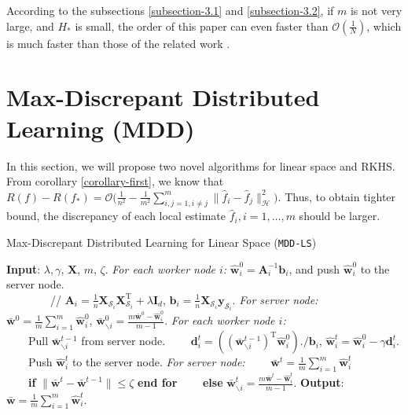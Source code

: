 \documentclass{article}
\begin{document}
According to the subsections \ref{subsection-3.1} and \ref{subsection-3.2},
if $m$ is not very large, and $H_\ast$ is small,
the order of this paper can even faster than $\mathcal{O}\left(\frac{1}{N}\right)$,
which is much faster than those of the related work \cite{zhang2012communication,Zhang2013,lin2017distributed}.

\section{Max-Discrepant Distributed Learning (MDD)}
In this section, we will propose two novel algorithms for linear space and RKHS.
From corollary \ref{corollary-first},  we know that
  $
     R(f)-R(f_\ast)=\mathcal{O}\Big(\frac{1}{n^2}-\frac{1}{m^2}\sum_{i,j=1,i\not=j}^m\|\hat{f}_i-\hat{f}_j\|_\mathcal{H}^2\Big).
$
Thus, to obtain tighter bound, the discrepancy of each local estimate $\hat{f}_i, i=1,\ldots,m$ should be larger.

\begin{algorithm}
    \caption{Max-Discrepant Distributed Learning for Linear Space (\texttt{MDD-LS})}
    \label{alg:RMMls}
    \begin{algorithmic}[1]
    \STATE \textbf{Input}: $\lambda,\gamma$, $\mathbf X$, $m$, $\zeta$.
     \STATE \emph{For each worker node $i$:} $\hat{\mathbf w}_i^0=\mathbf A_i^{-1} \mathbf b_i$, and push $\hat{\mathbf w}_i^0$ to the server node.\\
         ~~~~~~~~// $\mathbf A_i=\frac{1}{n}\mathbf X_{\mathcal{S}_i}\mathbf X_{\mathcal{S}_i}^\mathrm{T}+
            \lambda \mathbf I_d$, $\mathbf b_i= \frac{1}{n}\mathbf X_{\mathcal{S}_i}\mathbf y_{\mathcal{S}_i}$.
    \STATE \emph{For server node:}
    $\bar{\mathbf w}^0=\frac{1}{m}\sum_{i=1}^m\hat{\mathbf w}_i^0$,
    $\bar{\mathbf w}^{0}_{\backslash i}=\frac{m\bar{\mathbf w}^{0}-\hat{\mathbf w}_i^0}{m-1}$.
    \STATE  \emph{For each worker node $i$:} \\
    ~~~~Pull $\bar{\mathbf w}^{t-1}_{\backslash i}$ from server node.
    \STATE ~~~~$\mathbf d_i^t=\left(\left(\bar{\mathbf w}^{t-1}_{\backslash i}\right)^\mathrm{T}\hat{\mathbf w}_i^{0}\right)./\mathbf b_i$,
     $\hat{\mathbf w}_i^t=\hat{\mathbf w}_i^0-\gamma\mathbf d_i^t$.
    \STATE ~~~~Push $\hat{\mathbf w}_i^t$ to the server node.
     \STATE \emph{For server node:}
     \STATE ~~~~$\bar{\mathbf w}^t=\frac{1}{m}\sum_{i=1}^m\hat{\mathbf w}_i^t$\\
      ~~~~\textbf{if} {$\|\bar{\mathbf w}^{t}-\bar{\mathbf w}^{t-1}\|\leq \zeta$} \textbf{end for}
      \STATE ~~~~\textbf{else} $\bar{\mathbf w}^{t}_{\backslash i}=\frac{m\bar{\mathbf w}^{t}-\hat{\mathbf w}_i^t}{m-1}$.
    \ENDFOR
    \STATE \textbf{Output}: $\bar{\mathbf w}=\frac{1}{m}\sum_{i=1}^m\hat{\mathbf w}_i^t$.
    \end{algorithmic}
\end{algorithm}
\end{document}
